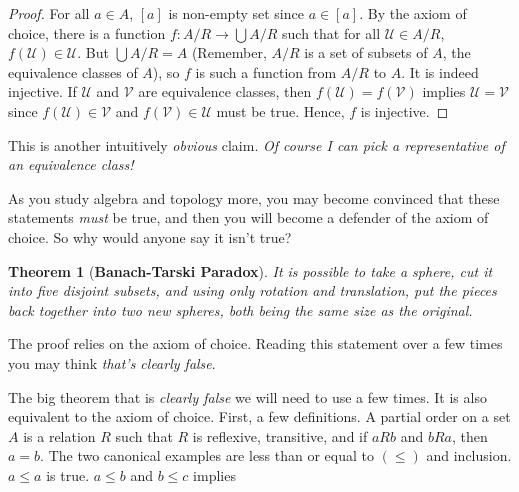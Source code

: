\documentclass{article}
\theoremstyle{plain}
\newtheorem{theorem}{Theorem}[section]
\theoremstyle{normal}
\newenvironment{definition}{%
    \pushQED{\qed}\renewcommand{\qedsymbol}{$\blacksquare$}\definitionx%
}{%
    \popQED\enddefinitionx%
}
\begin{document}
        \begin{proof}
            For all $a\in{A}$, $[a]$ is non-empty set since $a\in[a]$. By the
            axiom of choice, there is a function
            $f:A/R\rightarrow\bigcup{A}/R$ such that for all
            $\mathcal{U}\in{A}/R$, $f(\mathcal{U})\in\mathcal{U}$. But
            $\bigcup{A}/R=A$ (Remember, $A/R$ is a set of subsets of $A$, the
            equivalence classes of $A$), so $f$ is such a function from
            $A/R$ to $A$. It is indeed injective. If
            $\mathcal{U}$ and $\mathcal{V}$ are equivalence classes,
            then $f(\mathcal{U})=f(\mathcal{V})$ implies
            $\mathcal{U}=\mathcal{V}$ since
            $f(\mathcal{U})\in\mathcal{V}$ and $f(\mathcal{V})\in\mathcal{U}$
            must be true. Hence, $f$ is injective.
        \end{proof}
        This is another intuitively \textit{obvious} claim.
        \textit{Of course I can pick a representative of an equivalence class!}
        \par\hfill\par
        As you study algebra and topology more, you may become convinced that
        these statements \textit{must} be true, and then you will become a
        defender of the axiom of choice. So why would anyone say it isn't true?
        \begin{theorem}[\textbf{Banach-Tarski Paradox}]
            It is possible to take a sphere, cut it into five disjoint subsets,
            and using only rotation and translation, put the pieces back
            together into two new spheres, both being the same size as the
            original. 
        \end{theorem}
        The proof relies on the axiom of choice. Reading this statement over
        a few times you may think \textit{that's clearly false}.
        \par\hfill\par
        The big theorem that is \textit{clearly false} we will need to use a
        few times. It is also equivalent to the axiom of choice.
        First, a few definitions.
        \begin{definition}[\textbf{Partial Order}]
            A partial order on a set $A$ is a relation $R$ such that
            $R$ is reflexive, transitive, and if $aRb$ and $bRa$, then
            $a=b$.
        \end{definition}
        The two canonical examples are less than or equal to $(\leq)$ and
        inclusion. $a\leq{a}$ is true. $a\leq{b}$ and $b\leq{c}$ implies
\end{document}
